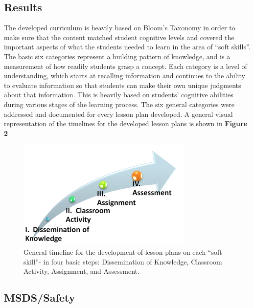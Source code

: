 \documentclass[11.5pt]{sig-alternate} %
\begin{document}
\begin{large}
\section*{Results}
The developed curriculum is heavily based on Bloom’s Taxonomy in order to make sure that the content matched student cognitive levels and covered the important aspects of what the students needed to learn in the area of “soft skills”. The basic six categories represent a building pattern of knowledge, and is a measurement of how readily students grasp a concept. Each category is a level of understanding, which starts at recalling information and continues to the ability to evaluate information so that students can make their own unique judgments about that information. This is heavily based on students’ cognitive abilities during various stages of the learning process. The six general categories were addressed and documented for every lesson plan developed. A general visual representation of the timelines for the developed lesson plans is shown in \textbf{Figure 2}
\newpage
\begin{figure}[h]
    \centering
    \includegraphics[width=1\linewidth]{images/fig2.png}
    \caption{General timeline for the development of lesson plans on each “soft skill”- in four basic steps: Dissemination of Knowledge, Classroom Activity, Assignment, and Assessment.}
\end{figure}

\subsection*{MSDS/Safety}


\end{large}
\end{document}

